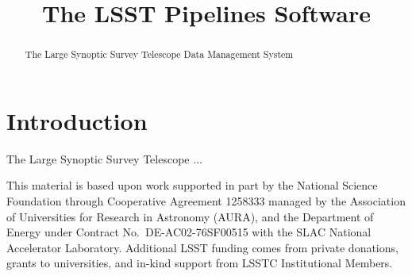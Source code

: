 \documentclass[twocolumn]{aastex62}
\begin{document}
\title{The LSST Pipelines Software}



\begin{abstract}

The Large Synoptic Survey Telescope Data Management System

\end{abstract}


% 

\section{Introduction}

The Large Synoptic Survey Telescope \citep[LSST;][]{2008arXiv0805.2366I}...


\acknowledgments
This material is based upon work supported in part by the National Science Foundation through Cooperative Agreement 1258333 managed by the Association of Universities for Research in Astronomy (AURA), and the Department of Energy under Contract No.\ DE-AC02-76SF00515 with the SLAC National Accelerator Laboratory.
Additional LSST funding comes from private donations, grants to universities, and in-kind support from LSSTC Institutional Members.



\end{document}
